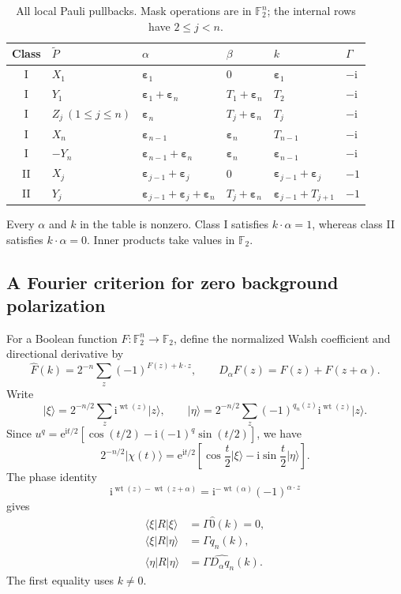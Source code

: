 \documentclass[11pt,a4paper]{article}
\numberwithin{equation}{section}
\theoremstyle{definition}
\newcommand{\F}{\mathbb F}
\newcommand{\ii}{\mathrm i}
\newcommand{\ee}{\mathrm e}
\newcommand{\wt}{\operatorname{wt}}
\newcommand{\ket}[1]{\lvert#1\rangle}
\newcommand{\bra}[1]{\langle#1\rvert}
\newcommand{\eps}{\bm\varepsilon}
\begin{document}
\begin{table}[htbp]
\centering
\caption{All local Pauli pullbacks. Mask operations are in $\F_2^n$; the internal rows have $2\leq j<n$.}
\label{tab:pullback}
\small
\renewcommand{\arraystretch}{1.3}
\begin{tabular}{@{}clllll@{}}
\toprule
Class & $\widetilde P$ & $\alpha$ & $\beta$ & $k$ & $\Gamma$\\
\midrule
I & $X_1$ & $\eps_1$ & $0$ & $\eps_1$ & $-\ii$\\
I & $Y_1$ & $\eps_1+\eps_n$ & $T_1+\eps_n$ & $T_2$ & $-\ii$\\
I & $Z_j\ (1\leq j\leq n)$ & $\eps_n$ & $T_j+\eps_n$ & $T_j$ & $-\ii$\\
I & $X_n$ & $\eps_{n-1}$ & $\eps_n$ & $T_{n-1}$ & $-\ii$\\
I & $-Y_n$ & $\eps_{n-1}+\eps_n$ & $\eps_n$ & $\eps_{n-1}$ & $-\ii$\\
II & $X_j$ & $\eps_{j-1}+\eps_j$ & $0$ & $\eps_{j-1}+\eps_j$ & $-1$\\
II & $Y_j$ & $\eps_{j-1}+\eps_j+\eps_n$ & $T_j+\eps_n$ & $\eps_{j-1}+T_{j+1}$ & $-1$\\
\bottomrule
\end{tabular}
\end{table}

Every $\alpha$ and $k$ in the table is nonzero. Class I satisfies $k\cdot\alpha=1$, whereas class II satisfies $k\cdot\alpha=0$. Inner products take values in $\F_2$.

\subsection{A Fourier criterion for zero background polarization}

For a Boolean function $F:\F_2^n\to\F_2$, define the normalized Walsh coefficient and directional derivative by
\begin{equation}
 \widehat F(k)=2^{-n}\sum_z(-1)^{F(z)+k\cdot z},\qquad
 D_\alpha F(z)=F(z)+F(z+\alpha).
 \label{eq:walsh}
\end{equation}
Write
\begin{equation}
 \ket\xi=2^{-n/2}\sum_z\ii^{\wt(z)}\ket z,\qquad
 \ket\eta=2^{-n/2}\sum_z(-1)^{q_n(z)}\ii^{\wt(z)}\ket z.
\end{equation}
Since $u^q=\ee^{\ii t/2}[\cos(t/2)-\ii(-1)^q\sin(t/2)]$, we have
\begin{equation}
 2^{-n/2}\ket{\chi(t)}
 =\ee^{\ii t/2}\left[\cos\frac t2\ket\xi-\ii\sin\frac t2\ket\eta\right].
 \label{eq:chi-decompose}
\end{equation}
The phase identity
\begin{equation}
 \ii^{\wt(z)-\wt(z+\alpha)}
 =\ii^{-\wt(\alpha)}(-1)^{\alpha\cdot z}
\end{equation}
gives
\begin{align}
 \bra\xi R\ket\xi&=\Gamma\widehat 0(k)=0,\\
 \bra\xi R\ket\eta&=\Gamma\widehat {q_n}(k),\\
 \bra\eta R\ket\eta&=\Gamma\widehat {D_\alpha q_n}(k).
 \label{eq:walsh-matrix}
\end{align}
The first equality uses $k\ne0$.
\end{document}
